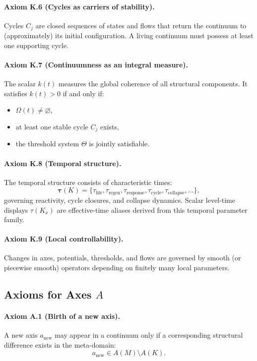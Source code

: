 \paragraph{Axiom K.6 (Cycles as carriers of stability).}
Cycles \(C_j\) are closed sequences of states and flows that return the continuum to (approximately) its initial configuration.
A living continuum must possess at least one supporting cycle.

\paragraph{Axiom K.7 (Continuumness as an integral measure).}
The scalar \(k(t)\) measures the global coherence of all structural components.
It satisfies \(k(t)>0\) if and only if:
\begin{itemize}
  \item \(\Omega(t)\neq\varnothing\),
  \item at least one stable cycle \(C_j\) exists,
  \item the threshold system \(\Theta\) is jointly satisfiable.
\end{itemize}

\paragraph{Axiom K.8 (Temporal structure).}
The temporal structure consists of characteristic times:
\[
  \boldsymbol{\tau}(K)=\{\tau_{\mathrm{life}},\tau_{\mathrm{regen}},
  \tau_{\mathrm{response}},\tau_{\mathrm{cycle}},
  \tau_{\mathrm{collapse}},\dots\},
\]
governing reactivity, cycle closures, and collapse dynamics. Scalar level-time
displays \(\tau(K_x)\) are effective-time aliases derived from this temporal
parameter family.

\paragraph{Axiom K.9 (Local controllability).}
Changes in axes, potentials, thresholds, and flows are governed by smooth (or piecewise smooth) operators depending on finitely many local parameters.

\subsection{Axioms for Axes \texorpdfstring{\(A\)}{A}}

\paragraph{Axiom A.1 (Birth of a new axis).}
A new axis \(a_{\mathrm{new}}\) may appear in a continuum only if a corresponding structural difference exists in the meta-domain:
\[
  a_{\mathrm{new}}\in A(M)\setminus A(K).
\]

